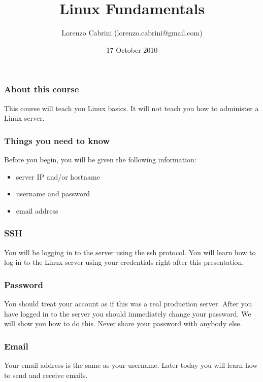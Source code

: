 \documentclass{beamer}
\title{Linux Fundamentals}
\author{Lorenzo Cabrini (lorenzo.cabrini@gmail.com)}
\date{17 October 2010}
\begin{document}
\frame{\titlepage}

\begin{frame}
\frametitle{About this course}
This course will teach you Linux basics. It will not teach you how to administer a Linux server.
\end{frame}

\begin{frame}
\frametitle{Things you need to know}
Before you begin, you will be given the following information:
\begin{itemize}
  \item<1->server IP and/or hostname
  \item<2->username and password
  \item<3->email address
\end{itemize}
\end{frame}

\begin{frame}
\frametitle{SSH}
You will be logging in to the server using the ssh protocol. You will learn
how to log in to the Linux server using your credentials right after this
presentation.
\end{frame}

\begin{frame}
\frametitle{Password}
You should treat your account as if this was a real production server. After
you have logged in to the server you should immediately change your password.
We will show you how to do this. Never share your password with anybody else.
\end{frame}

\begin{frame}
\frametitle{Email}
Your email address is the same as your username. Later today you will learn
how to send and receive emails.
\end{frame}
\end{document}

